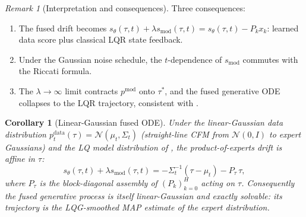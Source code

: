 \documentclass[11pt,letterpaper]{article}
\theoremstyle{plain}
\newtheorem{corollary}[theorem]{Corollary}
\theoremstyle{definition}
\theoremstyle{remark}
\newtheorem{remark}[theorem]{Remark}
\newcommand{\calN}{\mathcal{N}}
\newcommand{\smodel}{s_{\mathrm{mod}}}
\begin{document}
\begin{remark}[Interpretation and consequences]\label{rem:lq-bridge}
Three consequences:
\begin{enumerate}[leftmargin=*,itemsep=1pt]
  \item The fused drift becomes
        $s_\theta(\tau,t)+\lambda\smodel(\tau,t)=s_\theta(\tau,t)-P_k x_k$:
        learned data score plus classical LQR state feedback.
  \item Under the Gaussian noise schedule, the
        $t$-dependence of $\smodel$ commutes with the Riccati formula.
  \item The $\lambda\to\infty$ limit contracts $p^{\mathrm{mod}}$ onto
        $\tau^*$, and the fused generative ODE collapses to the LQR
        trajectory, consistent with .
\end{enumerate}
\end{remark}

\begin{corollary}[Linear-Gaussian fused ODE]\label{cor:lq-ode}
Under the linear-Gaussian data distribution
$p^{\mathrm{data}}_t(\tau)=\calN(\mu_t,\Sigma_t)$ (straight-line CFM from
$\calN(0,I)$ to expert Gaussians) and the LQ model distribution of
, the product-of-experts drift is affine in $\tau$:
\[
  s_\theta(\tau,t)+\lambda\smodel(\tau,t)
  =-\Sigma_t^{-1}(\tau-\mu_t)-P_\tau\,\tau,
\]
where $P_\tau$ is the block-diagonal assembly of $(P_k)_{k=0}^{H}$ acting
on $\tau$. Consequently the fused generative process is itself
linear-Gaussian and \emph{exactly solvable}: its trajectory is the
LQG-smoothed MAP estimate of the expert distribution.
\end{corollary}



\end{document}
